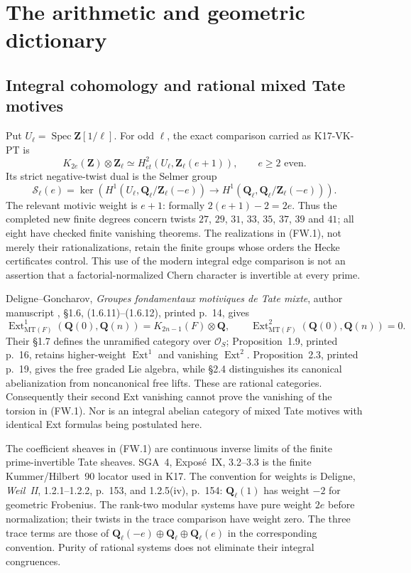 \section{The arithmetic and geometric dictionary}
\label{sec:framework}

\subsection{Integral cohomology and rational mixed Tate motives}

Put $U_\ell=\operatorname{Spec}\mathbf Z[1/\ell]$.
For odd $\ell$, the exact comparison carried as K17-VK-PT is
\[
 K_{2e}(\mathbf Z)\otimes\mathbf Z_\ell
       \simeq H^2_{\acute et}(U_\ell,\mathbf Z_\ell(e+1)),
 \qquad e\ge2\text{ even}.
 \tag{FW.1}
\]
Its strict negative-twist dual is the Selmer group
\[
 \mathcal S_\ell(e)=\ker\left(
 H^1(U_\ell,\mathbf Q_\ell/\mathbf Z_\ell(-e))
 \longrightarrow
 H^1(\mathbf Q_\ell,\mathbf Q_\ell/\mathbf Z_\ell(-e))\right).
 \tag{FW.2}
\]
The relevant motivic weight is $e+1$: formally $2(e+1)-2=2e$.
Thus the completed new finite degrees concern twists $27$, $29$, $31$,
$33$, $35$, $37$, $39$ and $41$; all eight have checked finite vanishing theorems.
The realizations in (FW.1), not merely their rationalizations,
retain the finite groups whose orders the Hecke certificates
control. This use of the modern integral edge comparison is
not an assertion that a factorial-normalized Chern character
is invertible at every prime.

Deligne--Goncharov, \emph{Groupes fondamentaux motiviques de
Tate mixte}, author manuscript , \S1.6,
(1.6.11)--(1.6.12), printed p.~14, gives
\[
 \operatorname{Ext}^1_{\mathrm{MT}(F)}(\mathbf Q(0),\mathbf Q(n))
       =K_{2n-1}(F)\otimes\mathbf Q,\qquad
 \operatorname{Ext}^2_{\mathrm{MT}(F)}(\mathbf Q(0),\mathbf Q(n))=0.
\]
Their \S1.7 defines the unramified category over $\mathcal O_S$;
Proposition~1.9, printed p.~16, retains higher-weight
$\operatorname{Ext}^1$ and vanishing $\operatorname{Ext}^2$.
Proposition~2.3, printed p.~19, gives the free graded Lie algebra,
while \S2.4 distinguishes its canonical abelianization from
noncanonical free lifts. These are rational categories.
Consequently their second Ext vanishing cannot prove the
vanishing of the torsion in (FW.1). Nor is an integral abelian
category of mixed Tate motives with identical Ext formulas
being postulated here.

The coefficient sheaves in (FW.1) are continuous inverse limits
of the finite prime-invertible Tate sheaves. SGA~4, Expos\'e~IX,
3.2--3.3 is the finite Kummer/Hilbert~90 locator used in K17.
The convention for weights is Deligne, \emph{Weil~II},
1.2.1--1.2.2, p.~153, and 1.2.5(iv), p.~154:
$\mathbf Q_\ell(1)$ has weight $-2$ for geometric Frobenius.
The rank-two modular systems have pure weight $2e$ before
normalization; their twists in the trace comparison have weight
zero. The three trace terms are those of
$\mathbf Q_\ell(-e)\oplus\mathbf Q_\ell\oplus\mathbf Q_\ell(e)$
in the corresponding convention. Purity of rational systems
does not eliminate their integral congruences.

